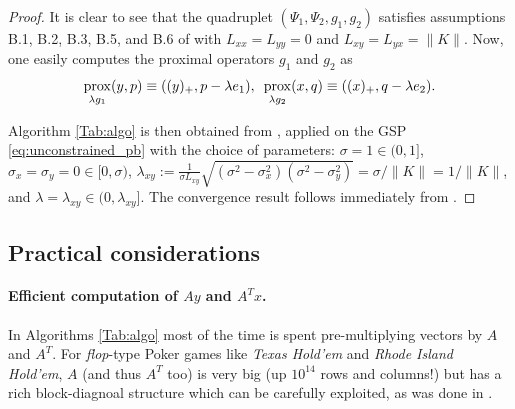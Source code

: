 \documentclass{article} %
\newtheorem{definition}[theorem]{Definition}
\DeclareMathOperator{\prox}{prox}
\begin{document}
\begin{proof}
It is clear to see that the quadruplet $(\Psi_1, \Psi_2, g_1, g_2)$
satisfies assumptions B.1, B.2, B.3, B.5, and B.6 of
\cite{he2013accelerating} with $L_{xx} = L_{yy} = 0$ and $L_{xy} =
L_{yx} = \|K\|$. Now, one easily computes the proximal operators $g_1$
and $g_2$ as
\begin{eqnarray*}
  \prox_{\lambda g_1}(y, p) \equiv ((y)_+, p - \lambda
  e_1),\hspace{.5em} \prox_{\lambda g_2}(x, q) \equiv ((x)_+, q -
  \lambda e_2).
  \end{eqnarray*}

Algorithm \ref{Tab:algo} is then obtained from \cite[Algorithm
  T-BD]{he2013accelerating}, applied on the GSP
\eqref{eq:unconstrained_pb} with the choice of parameters: $\sigma = 1
\in (0, 1]$, $\sigma_x = \sigma_y = 0 \in [0, \sigma)$,
    $\lambda_{xy} := \frac{1}{\sigma L_{xy}}\sqrt{(\sigma^2 -
        \sigma_x^2)(\sigma^2 - \sigma_y^2)} = \sigma / \|K\| =
      1/\|K\|$, and $\lambda = \lambda_{xy} \in (0,
      \lambda_{xy}]$. The convergence result follows immediately from
  \cite[Theorem 4.2]{he2013accelerating}.
\end{proof}

\subsection{Practical considerations}
\paragraph{\textbf{Efficient computation of $Ay$ and $A^Tx$.}}
In Algorithms \ref{Tab:algo} most of the time is spent
pre-multiplying vectors by $A$ and $A^T$. For \textit{flop}-type Poker
games like \textit{Texas Hold'em} and  \textit{Rhode Island Hold'em},
$A$ (and thus $A^T$ too)  is very big (up $10^{14}$ rows and columns!)
but has a rich block-diagnoal structure which can be carefully
exploited, as was done in \cite{hoda2010smoothing}.



\end{document}
